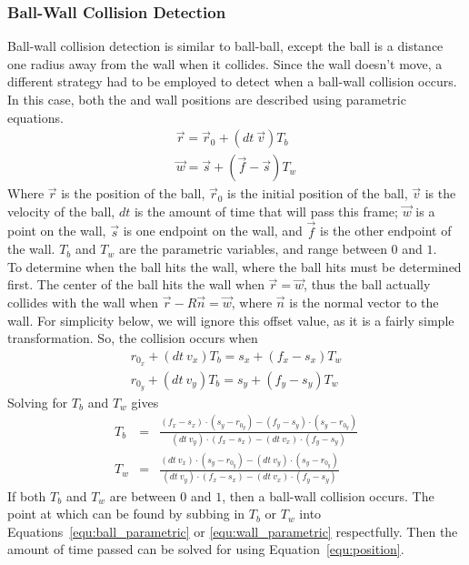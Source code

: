         \subsubsection{Ball-Wall Collision Detection}
        Ball-wall collision detection is similar to ball-ball, except the ball is a distance one radius away from the wall when it collides.
        Since the wall doesn't move, a different strategy had to be employed to detect when a ball-wall collision occurs. In this case,
        both the and wall positions are described using parametric equations.
        \begin{eqnarray}
            \vec r = \vec r_0 + (dt~\vec v) T_b         \label{equ:ball_parametric} \\
            \vec w = \vec s + (\vec f - \vec s) T_w     \label{equ:wall_parametric}
        \end{eqnarray}
        Where $\vec r$ is the position of the ball, $\vec r_0$ is the initial position of the ball, $\vec v$ is the velocity of the ball,
        $dt$ is the amount of time that will pass this frame; $\vec w$ is a point on the wall, $\vec s$ is one endpoint on the wall, and $\vec f$
        is the other endpoint of the wall. $T_b$ and $T_w$ are the parametric variables, and range between $0$ and $1$. \\
        To determine when the ball hits the wall, where the ball hits must be determined first. The center of the ball hits the wall when
        $\vec r = \vec w$, thus the ball actually collides with the wall when $\vec r - R \vec n = \vec w$, where $\vec n$ is the normal
        vector to the wall. For simplicity below, we will ignore this offset value, as it is a fairly simple transformation. So, the collision
        occurs when
        \begin{eqnarray}
            r_{0_x} + (dt~v_x) T_b = s_x + (f_x - s_x) T_w  \nonumber \\
            r_{0_y} + (dt~v_y) T_b = s_y + (f_y - s_y) T_w  \nonumber
        \end{eqnarray}
        Solving for $T_b$ and $T_w$ gives
        \begin{eqnarray}
            T_b &=& \frac{(f_x - s_x)\cdot(s_y - r_{0_y}) - (f_y - s_y)\cdot(s_y - r_{0_y})}{(dt~v_y)\cdot(f_x - s_x) - (dt~v_x)\cdot(f_y - s_y)} \nonumber \\
            T_w &=& \frac{(dt~v_x)\cdot(s_y - r_{0_y}) - (dt~v_y)\cdot(s_y - r_{0_y})}{(dt~v_y)\cdot(f_x - s_x) - (dt~v_x)\cdot(f_y - s_y)} \nonumber
        \end{eqnarray}
        If both $T_b$ and $T_w$ are between $0$ and $1$, then a ball-wall collision occurs. The point at which can be found by subbing in $T_b$ or $T_w$
        into Equations~\ref{equ:ball_parametric} or \ref{equ:wall_parametric} respectfully. Then the amount of time passed can be solved for using Equation~\ref{equ:position}.
    
